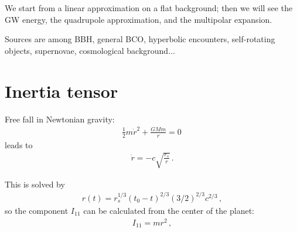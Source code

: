 \documentclass[main.tex]{subfiles}
\begin{document}

We start from a linear approximation on a flat background; 
then we will see the GW energy, the quadrupole approximation, and the multipolar expansion. 

Sources are among BBH, general BCO, hyperbolic encounters, 
self-rotating objects, supernovae, cosmological background... 

\section{Inertia tensor}

Free fall in Newtonian gravity: 
%
\begin{align}
\frac{1}{2} m \dot{r}^2 + \frac{GMm}{r} =0
\,
\end{align}
%
leads to 
%
\begin{align}
\dot{r} = - c \sqrt{ \frac{r_s}{r}}
\,.
\end{align}

This is solved by 
%
\begin{align}
r(t) = r_s^{1/3} (t_0 - t)^{2/3} (3/2)^{2/3} c^{2/3}
\,,
\end{align}
%
so the component \(I_{11} \) can be calculated from the center of the planet: 
%
\begin{align}
I_{11} = m r^2
\,,
\end{align}
%
\end{document}
